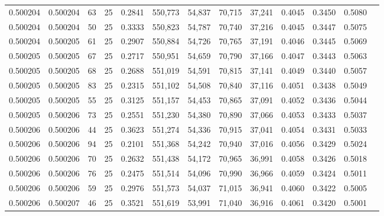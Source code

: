 \begin{tabular}{rrrrrrrrrrrrr}
0.500204 & 0.500204 &    63 &  25 &                                     0.2841 & 550,773 &  54,837 &  70,715 &  37,241 & 0.4045 & 0.3450 & 0.5080 \\
0.500204 & 0.500204 &    50 &  25 &                                     0.3333 & 550,823 &  54,787 &  70,740 &  37,216 & 0.4045 & 0.3447 & 0.5075 \\
0.500204 & 0.500205 &    61 &  25 &                                     0.2907 & 550,884 &  54,726 &  70,765 &  37,191 & 0.4046 & 0.3445 & 0.5069 \\
0.500205 & 0.500205 &    67 &  25 &                                     0.2717 & 550,951 &  54,659 &  70,790 &  37,166 & 0.4047 & 0.3443 & 0.5063 \\
0.500205 & 0.500205 &    68 &  25 &                                     0.2688 & 551,019 &  54,591 &  70,815 &  37,141 & 0.4049 & 0.3440 & 0.5057 \\
0.500205 & 0.500205 &    83 &  25 &                                     0.2315 & 551,102 &  54,508 &  70,840 &  37,116 & 0.4051 & 0.3438 & 0.5049 \\
0.500205 & 0.500205 &    55 &  25 &                                     0.3125 & 551,157 &  54,453 &  70,865 &  37,091 & 0.4052 & 0.3436 & 0.5044 \\
0.500205 & 0.500206 &    73 &  25 &                                     0.2551 & 551,230 &  54,380 &  70,890 &  37,066 & 0.4053 & 0.3433 & 0.5037 \\
0.500206 & 0.500206 &    44 &  25 &                                     0.3623 & 551,274 &  54,336 &  70,915 &  37,041 & 0.4054 & 0.3431 & 0.5033 \\
0.500206 & 0.500206 &    94 &  25 &                                     0.2101 & 551,368 &  54,242 &  70,940 &  37,016 & 0.4056 & 0.3429 & 0.5024 \\
0.500206 & 0.500206 &    70 &  25 &                                     0.2632 & 551,438 &  54,172 &  70,965 &  36,991 & 0.4058 & 0.3426 & 0.5018 \\
0.500206 & 0.500206 &    76 &  25 &                                     0.2475 & 551,514 &  54,096 &  70,990 &  36,966 & 0.4059 & 0.3424 & 0.5011 \\
0.500206 & 0.500206 &    59 &  25 &                                     0.2976 & 551,573 &  54,037 &  71,015 &  36,941 & 0.4060 & 0.3422 & 0.5005 \\
0.500206 & 0.500207 &    46 &  25 &                                     0.3521 & 551,619 &  53,991 &  71,040 &  36,916 & 0.4061 & 0.3420 & 0.5001 \\

\end{tabular}
